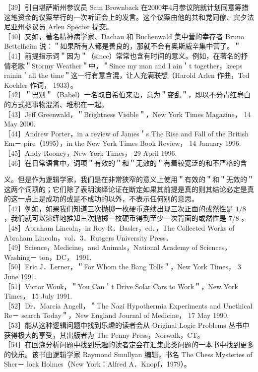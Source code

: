 ［39］引自堪萨斯州参议员 Sam Brownback 在2000年4月参议院就计划同意筹措这笔资金的议案举行的一次听证会上的发言。这个议案由他的共和党同僚、宾夕法尼亚州参议员 Arlen Specter 提交。\\
［40］又如，著名精神病学家、Dachau 和 Buchenwald 集中营的幸存者 Bruno Bettelheim 说：＂如果所有人都是善良的，那就不会有奥斯威辛集中营了。＂\\
［41］前提指示词＂因为＂（since）常常也含有时间的意义。例如，在著名的抒情老歌＂Stormy Weather＂中，＂Since my man and I ain＇t together，keeps rainin＇all the time＂这一行有意含混，让人充满联想（Harold Arlen 作曲，Ted Koehler 作词， 1933）。\\
［42］＂巴别＂（Babel）一名取自希伯来语，意为＂变乱＂，即以不分青红皂白的方式把事物混淆、堆积在一起。\\
［43］Jeff Greenwald，＂Brightness Visible＂，New York Times Magazine， 14 May 2000.\\
［44］Andrew Porter，in a review of James＇s The Rise and Fall of the British Em－ pire（1995），in the New York Times Book Review， 14 January 1996.\\
［45］Andy Rooney，New York Times， 29 April 1996.\\
［46］在日常语言中，词项＂有效的＂和＂无效的＂有着较宽泛的和不严格的含

义。但是作为逻辑学家，我们是在非常狭窄的意义上使用＂有效的＂和＂无效的＂这两个词项的；它们除了表明演绎论证在断定如果其前提是真的则其结论必定是真的这一点上是成功的或是不成功的以外，不表示任何别的意思。\\
［47］例如，如果我们知道三次抛掷一枚硬币连续出现三次正面的或然性是 $1 / 8$ ，我们就可以演绎地推知三次抛掷一枚硬币得到至少一次背面的或然性是 $7 / 8$ 。\\
［48］Abraham Lincoln，in Roy R．Basler，ed．，The Collected Works of Abraham Lincoln，vol．3．Rutgers University Press．\\
［49］Science，Medicine，and Animals，National Academy of Sciences，Washing－ ton，DC， 1991.\\
［50］Eric J．Lerner，＂For Whom the Bang Tolls＂，New York Times， 3 June 1991.\\
［51］Victor Wouk，＂You Can＇t Drive Solar Cars to Work＂，New York Times， 15 July 1991.\\
［52］Dr．Marcia Angell，＂The Nazi Hypothermia Experiments and Unethical Re－ search Today＂，New England Journal of Medicine， 17 May 1990.\\
［53］能从这种逻辑问题中找到乐趣的读者会从 Original Logic Problems 丛书中获得极大的享受，其出版者为 The Penny Press，Norwalk，CT。\\
［54］在回溯分析问题中找到乐趣的读者定会在汇集此类问题的一本书中找到更多的快乐。该书由逻辑学家 Raymond Smullyan 编辑，书名 The Chess Mysteries of Sher－ lock Holmes（New York：Alfred A．Knopf，1979）。
